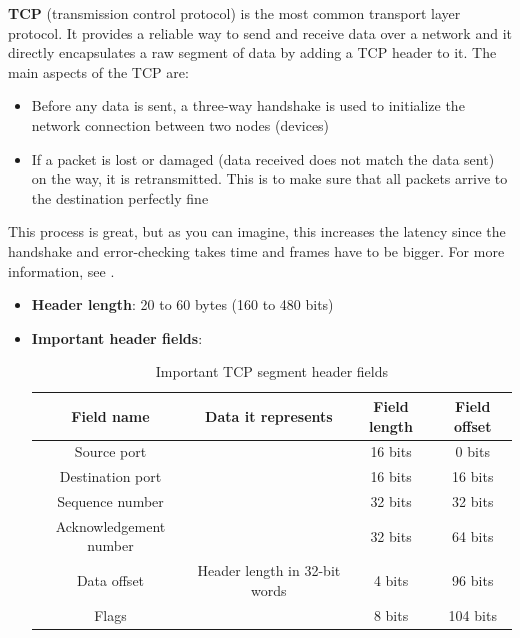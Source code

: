 \documentclass[a4paper]{article}
\begin{document}
  \textbf{TCP} (transmission control protocol) is the most common transport 
  layer protocol. It provides a reliable way to send and receive data over a 
  network and it directly encapsulates a raw segment of data by adding 
  a TCP header to it. 
  The main aspects of the TCP are:
  \begin{itemize}
    \item Before any data is sent, a three-way handshake is used 
      to initialize the network connection between two nodes (devices)
    \item If a packet is lost or damaged (data received does not match the 
      data sent) on the way, it is retransmitted. This is to make sure
      that all packets arrive to the destination perfectly fine
  \end{itemize}
  This process is great, but as you can imagine, this increases the latency 
  since the handshake and error-checking takes time and frames have to be 
  bigger.
  For more information, see \cite{wikipedia:tcp}.

  \begin{itemize}
    \item \textbf{Header length}: 20 to 60 bytes (160 to 480 bits)
    \item \textbf{Important header fields}:
      \begin{table}[h]
        \centering
        \begin{tabular}{|c|c|c|c|}
          \hline
          Field name & Data it represents & Field length & Field offset \\
          \hline
          \hline
          Source port & & 16 bits & 0 bits \\
          \hline
          Destination port & & 16 bits & 16 bits \\
          \hline
          Sequence number & & 32 bits & 32 bits \\
          \hline
          Acknowledgement number & & 32 bits & 64 bits \\
          \hline
          Data offset & Header length in 32-bit words & 4 bits & 96 bits \\
          \hline
          Flags & & 8 bits & 104 bits \\
          \hline
        \end{tabular}
        \caption{Important TCP segment header fields}
      \end{table}
  \end{itemize}

  \vspace{1cm}
\end{document}
